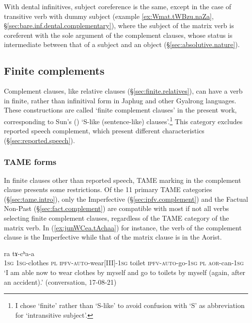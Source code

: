 With dental infinitives, subject coreference is the same, except in the case of transitive verb with dummy subject (example \ref{ex:Wmat.tWBzu.naZa}, §\ref{sec:bare.inf.dental.complementary}), where the subject of the matrix verb is coreferent with the sole argument of the complement clauses, whose status is intermediate between that of a subject and an object (§\ref{sec:absolutive.nature}).

 \subsection{Finite complements} \label{sec:finite.complement}
 Complement clauses, like relative clauses (§\ref{sec:finite.relatives}), can have a verb in finite, rather than infinitival form in Japhug and other Gyalrong languages. These constructions are called `finite complement clauses' in the present work, corresponding to Sun's (\citeyear[475-477]{sun12complementation})  `S-like (sentence-like) clauses'.\footnote{I chose `finite' rather than `S-like' to avoid confusion with `S' as abbreviation for  `intransitive subject'.   } This category excludes reported speech complement, which present different characteristics (§\ref{sec:reported.speech}).

 \subsubsection{TAME forms} \label{sec:TAM.finite}
In finite clauses other than reported speech, TAME marking in the complement clause presents some restrictions. Of the 11 primary TAME categories (§\ref{sec:tame.intro}), only the Imperfective (§\ref{sec:ipfv.complement}) and the Factual Non-Past (§\ref{sec:fact.complement}) are compatible with most if not all verbs selecting finite complement clauses, regardless of the TAME category of the matrix verb. In (\ref{ex:junWCea.tAchaa}) for instance, the verb of the complement clause is the Imperfective while that of the matrix clause is in the Aorist.

\begin{exe}
\ex \label{ex:junWCea.tAchaa}
  ra tɤ-cʰa-a \\
 \textsc{1sg} \textsc{1sg}-clothes \textsc{pl} \textsc{ipfv}-\textsc{auto}-wear[III]-\textsc{1sg} toilet \textsc{ipfv}-\textsc{auto}-go-\textsc{1sg} \textsc{pl} \textsc{aor}-can-\textsc{1sg} \\
 \glt  `I am able now to wear clothes by myself and go to toilets by myself (again, after an accident).' (conversation, 17-08-21)
 \end{exe}

